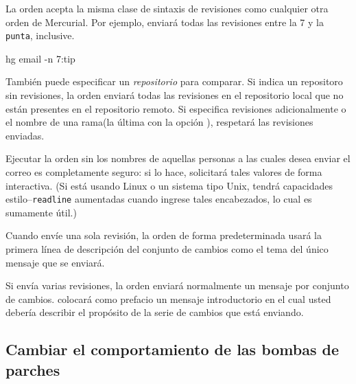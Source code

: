 La orden  acepta la misma clase de sintaxis
de revisiones como cualquier otra orden de Mercurial.  Por ejemplo,
enviará todas las revisiones entre la 7 y la \texttt{punta}, inclusive.
\begin{codesample2}
  hg email -n 7:tip
\end{codesample2}
También puede especificar un \emph{repositorio} para comparar.  Si
indica un repositoro sin revisiones, la orden 
enviará todas las revisiones en el repositorio local que no están
presentes en el repositorio remoto.  Si especifica revisiones
adicionalmente o el nombre de una rama(la última con la opción
), respetará las revisiones enviadas.

Ejecutar la orden  sin los nombres de
aquellas personas a las cuales desea enviar el correo es completamente
seguro: si lo hace, solicitará tales valores de forma interactiva.
(Si está usando Linux o un sistema tipo Unix, tendrá capacidades
estilo--\texttt{readline} aumentadas cuando ingrese tales encabezados,
lo cual es sumamente útil.)

Cuando envíe una sola revisión, la orden 
de forma predeterminada usará la primera línea de descripción del
conjunto de cambios como el tema del único mensaje que se enviará.

Si envía varias revisiones, la orden  enviará
normalmente un mensaje por conjunto de cambios.  colocará como
prefacio un mensaje introductorio en el cual usted debería describir
el propósito de la serie de cambios que está enviando.

\subsection{Cambiar el comportamiento de las bombas de parches}


